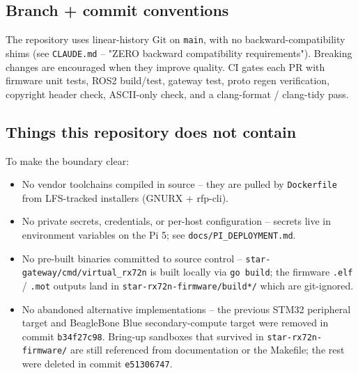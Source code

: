 \subsection{Branch + commit conventions}

The repository uses linear-history Git on \texttt{main}, with no
backward-compatibility shims (see \texttt{CLAUDE.md} -- "ZERO
backward compatibility requirements"). Breaking changes are
encouraged when they improve quality. CI gates each PR with
firmware unit tests, ROS2 build/test, gateway test, proto regen
verification, copyright header check, ASCII-only check, and a
clang-format / clang-tidy pass.

\subsection{Things this repository does not contain}

To make the boundary clear:

\begin{itemize}
  \item No vendor toolchains compiled in source -- they are pulled by
        \texttt{Dockerfile} from LFS-tracked installers (GNURX +
        rfp-cli).
  \item No private secrets, credentials, or per-host configuration --
        secrets live in environment variables on the Pi 5; see
        \texttt{docs/PI\_DEPLOYMENT.md}.
  \item No pre-built binaries committed to source control --
        \texttt{star-gateway/cmd/virtual\_rx72n} is built locally via
        \texttt{go build}; the firmware \texttt{.elf} / \texttt{.mot}
        outputs land in \texttt{star-rx72n-firmware/build*/} which are
        git-ignored.
  \item No abandoned alternative implementations -- the previous
        STM32 peripheral target and BeagleBone Blue secondary-compute
        target were removed in commit \texttt{b34f27c98}.
        Bring-up sandboxes that survived in
        \texttt{star-rx72n-firmware/} are still referenced from
        documentation or the Makefile; the rest were deleted in commit
        \texttt{e51306747}.
\end{itemize}
